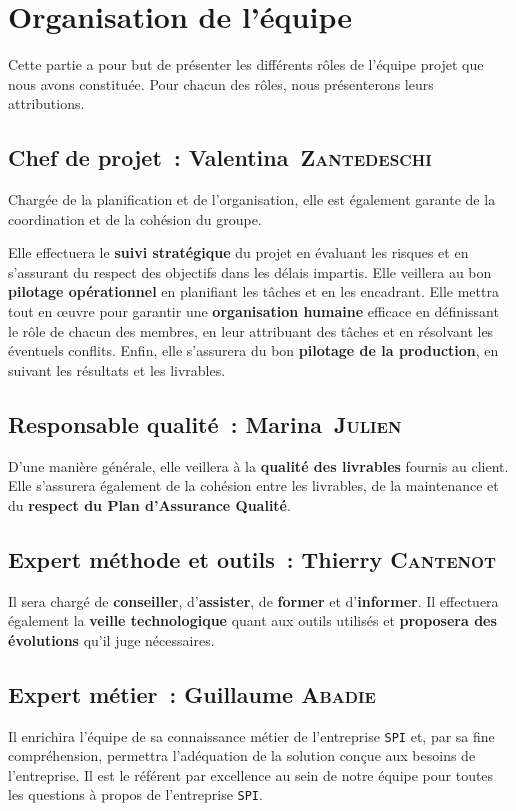 \chapter{Organisation de l'équipe}
Cette partie a pour but de présenter les différents rôles de l'équipe projet que nous avons constituée. Pour chacun des rôles, nous présenterons leurs attributions.

\section{Chef de projet~: Valentina~\textsc{Zantedeschi}}
Chargée de la planification et de l'organisation, elle est également garante de la coordination et de la cohésion du groupe.

Elle effectuera le \textbf{suivi stratégique} du projet en évaluant les risques et en s'assurant du respect des objectifs dans les délais impartis. Elle veillera au bon \textbf{pilotage opérationnel} en planifiant les tâches et en les encadrant. Elle mettra tout en œuvre pour garantir une \textbf{organisation humaine} efficace en définissant le rôle de chacun des membres, en leur attribuant des tâches et en résolvant les éventuels conflits. Enfin, elle s'assurera du bon \textbf{pilotage de la production}, en suivant les résultats et les livrables.

\section{Responsable qualité~: Marina~\textsc{Julien}}
D'une manière générale, elle veillera à la \textbf{qualité des livrables} fournis au client. Elle s'assurera également de la cohésion entre les livrables, de la maintenance et du \textbf{respect du Plan d'Assurance Qualité}.

\section{Expert méthode et outils~: Thierry \textsc{Cantenot}}
Il sera chargé de \textbf{conseiller}, d'\textbf{assister}, de \textbf{former} et d'\textbf{informer}. Il effectuera également la \textbf{veille technologique} quant aux outils utilisés et \textbf{proposera des évolutions} qu'il juge nécessaires.

\section{Expert métier~: Guillaume \textsc{Abadie}}
Il enrichira l'équipe de sa connaissance métier de l'entreprise \texttt{SPI} et, par sa fine compréhension, permettra l'adéquation de la solution conçue aux besoins de l'entreprise. Il est le référent par excellence au sein de notre équipe pour toutes les questions à propos de l'entreprise \texttt{SPI}.


